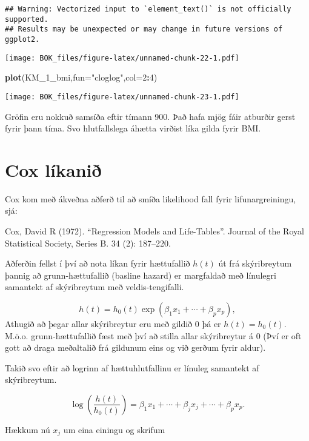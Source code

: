 \documentclass[
]{book}
\newenvironment{Shaded}{\begin{snugshade}}{\end{snugshade}}
\newcommand{\DataTypeTok}[1]{\textcolor[rgb]{0.13,0.29,0.53}{#1}}
\newcommand{\DecValTok}[1]{\textcolor[rgb]{0.00,0.00,0.81}{#1}}
\newcommand{\KeywordTok}[1]{\textcolor[rgb]{0.13,0.29,0.53}{\textbf{#1}}}
\newcommand{\NormalTok}[1]{#1}
\newcommand{\OperatorTok}[1]{\textcolor[rgb]{0.81,0.36,0.00}{\textbf{#1}}}
\newcommand{\StringTok}[1]{\textcolor[rgb]{0.31,0.60,0.02}{#1}}
\begin{document}
\begin{verbatim}
## Warning: Vectorized input to `element_text()` is not officially supported.
## Results may be unexpected or may change in future versions of ggplot2.
\end{verbatim}

\texttt{[image: BOK\_files/figure-latex/unnamed-chunk-22-1.pdf]}

\begin{Shaded}
\begin{Highlighting}[]
\KeywordTok{plot}\NormalTok{(KM\_}\DecValTok{1}\NormalTok{\_bmi,}\DataTypeTok{fun=}\StringTok{"cloglog"}\NormalTok{,}\DataTypeTok{col=}\DecValTok{2}\OperatorTok{:}\DecValTok{4}\NormalTok{)}
\end{Highlighting}
\end{Shaded}

\texttt{[image: BOK\_files/figure-latex/unnamed-chunk-23-1.pdf]}

Gröfin eru nokkuð samsíða eftir tímann 900. Það hafa mjög fáir atburðir gerst fyrir þann tíma. Svo hlutfallslega áhætta virðist líka gilda fyrir BMI.

\hypertarget{cox}{%
\section{Cox líkanið}\label{cox}}

Cox kom með ákveðna aðferð til að smíða likelihood fall fyrir lifunargreiningu, sjá:

Cox, David R (1972). ``Regression Models and Life-Tables''. Journal of the Royal Statistical Society, Series B. 34 (2): 187--220.

Aðferðin fellst í því að nota líkan fyrir hættufallið \(h(t)\) út frá skýribreytum þannig að grunn-hættufallið (basline hazard) er margfaldað með línulegri samantekt af skýribreytum með veldis-tengifalli.

\[
h(t) = h_0(t) \exp(\beta_1 x_1 + \cdots + \beta_p x_p),
\]
Athugið að þegar allar skýribreytur eru með gildið 0 þá er \(h(t) = h_0(t)\). M.ö.o. grunn-hættufallið fæst með því að stilla allar skýribreytur á 0 (Því er oft gott að draga meðaltalið frá gildunum eins og við gerðum fyrir aldur).

Takið svo eftir að logrinn af hættuhlutfallinu er línuleg samantekt af skýribreytum.

\[
\log \left( \frac{h(t)}{h_0(t)} \right) = \beta_1 x_1 + \cdots + \beta_j x_j + \cdots + \beta_p x_p.
\]

Hækkum nú \(x_j\) um eina einingu og skrifum
\end{document}
